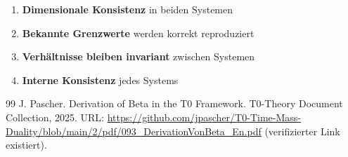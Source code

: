 	\begin{enumerate}
		\item \textbf{Dimensionale Konsistenz} in beiden Systemen
		\item \textbf{Bekannte Grenzwerte} werden korrekt reproduziert
		\item \textbf{Verhältnisse bleiben invariant} zwischen Systemen
		\item \textbf{Interne Konsistenz} jedes Systems
	\end{enumerate}
	
	\begin{thebibliography}{99}
J. Pascher.
\newblock Derivation of Beta in the T0 Framework.
\newblock T0-Theory Document Collection, 2025.
\newblock URL: \url{https://github.com/jpascher/T0-Time-Mass-Duality/blob/main/2/pdf/093_DerivationVonBeta_En.pdf}
(verifizierter Link existiert).
\end{thebibliography}